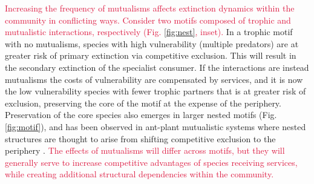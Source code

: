 \documentclass[twocolumn,preprintnumbers,amsmath,amssymb,superscriptaddress,linenumbers]{revtex4-1}
\newcommand{\rev}[1]{\textcolor{crimson}{#1}}
\begin{document}
% 



\rev{Increasing the frequency of mutualisms affects extinction dynamics within the community in conflicting ways.
Consider two motifs composed of trophic and mutualistic interactions, respectively (Fig. \ref{fig:nest}, inset).}
In a trophic motif with no mutualisms, species with high vulnerability (multiple predators) are at greater risk of primary extinction via competitive exclusion. 
This will result in the secondary extinction of the specialist consumer. 
If the interactions are instead mutualisms the costs of vulnerability are compensated by services, and it is now the low vulnerability species with fewer trophic partners that is at greater risk of exclusion, preserving the core of the motif at the expense of the periphery.
Preservation of the core species also emerges in larger nested motifs (Fig. \ref{fig:motif}), and has been observed in ant-plant mutualistic systems where nested structures are thought to arise from shifting competitive exclusion to the periphery \cite{Dattilo2013}.
\rev{The effects of mutualisms will differ across motifs, but they will generally serve to increase competitive advantages of species receiving services, while creating additional structural dependencies within the community.
}
\end{document}
